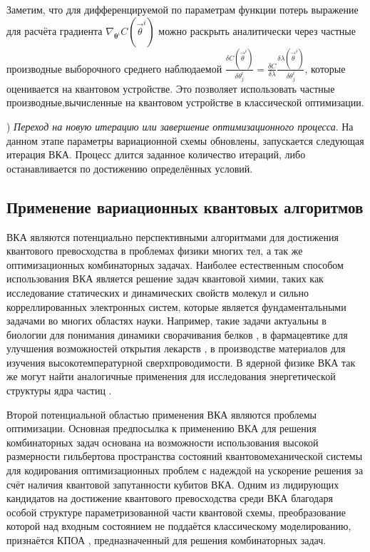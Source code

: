 \documentclass[14pt]{extarticle}
\begin{document}
\qquad Заметим, что для дифференцируемой по параметрам функции потерь выражение для расчёта градиента $\nabla_{\mathbf{\theta}^{i}} C(\vec{\theta}^{i})$ можно раскрыть аналитически через частные производные выборочного среднего наблюдаемой $\frac{\delta C(\vec{\theta}^{i})}{\delta \theta^{i}_{j}} = \frac{\delta C}{\delta \lambda} \frac{\delta \lambda(\vec{\theta}^{i})}{\delta \theta^{i}_{j}}$, которые оценивается на квантовом устройстве. Это позволяет использовать частные производные,вычисленные на квантовом устройстве в классической оптимизации.


) \emph{Переход на новую итерацию или завершение оптимизационного процесса}. На данном этапе параметры вариационной схемы обновлены, запускается следующая итерация ВКА. Процесс длится заданное количество итераций, либо останавливается по достижению определённых условий.


\subsection[Применение вариационных квантовых алгоритмов]{Применение вариационных квантовых \linebreak алгоритмов}

\qquad ВКА являются потенциально перспективными алгоритмами для достижения квантового превосходства в проблемах физики многих тел, а так же оптимизационных комбинаторных задачах. Наиболее естественным способом использования ВКА является решение задач квантовой химии, таких как исследование статических и динамических свойств молекул и сильно корреллированных электронных систем, которые является фундаментальными задачами во многих областях науки. Например, такие задачи актуальны в биологии для понимания динамики сворачивания белков \cite{Outeiral_2020}, в фармацевтике для улучшения возможностей открытия лекарств \cite{10.1147/JRD.2018.2888987}, в производстве материалов для изучения высокотемпературной сверхпроводимости. В ядерной физике ВКА так же могут найти аналогичные применения для исследования энергетической структуры ядра частиц \cite{Dumitrescu_2018}. 


\qquad Второй потенциальной областью применения ВКА являются проблемы оптимизации. Основная предпосылка к применению ВКА для решения комбинаторных задач основана на возможности использования высокой размерности гильбертова пространства состояний квантовомеханической системы для кодирования оптимизационных проблем с надеждой на ускорение решения за счёт наличия квантовой запутанности кубитов ВКА. Одним из лидирующих кандидатов на достижение квантового превосходства среди ВКА благодаря особой структуре параметризованной части квантовой схемы, преобразование которой над входным состоянием не поддаётся классическому моделированию, признаётся КПОА \cite{https://doi.org/10.48550/arxiv.1411.4028}, предназначенный для решения комбинаторных задач.
\end{document}
